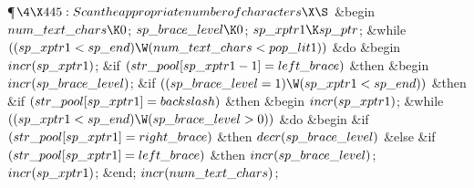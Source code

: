 \Y\P$\4\X445:Scan the appropriate number of characters\X\S$\6
\&{begin} $\\{num\_text\_chars}\K0$;\5
$\\{sp\_brace\_level}\K0$;\5
$\\{sp\_xptr1}\K\\{sp\_ptr}$;\6
\&{while} $((\\{sp\_xptr1}<\\{sp\_end})\W(\\{num\_text\_chars}<\\{pop\_lit1}))$
\1\&{do}\6
\&{begin} $\\{incr}(\\{sp\_xptr1})$;\6
\&{if} $(\\{str\_pool}[\\{sp\_xptr1}-1]=\\{left\_brace})$ \1\&{then}\6
\&{begin} $\\{incr}(\\{sp\_brace\_level})$;\6
\&{if} $((\\{sp\_brace\_level}=1)\W(\\{sp\_xptr1}<\\{sp\_end}))$ \1\&{then}\6
\&{if} $(\\{str\_pool}[\\{sp\_xptr1}]=\\{backslash})$ \1\&{then}\6
\&{begin} $\\{incr}(\\{sp\_xptr1})$;\6
\&{while} $((\\{sp\_xptr1}<\\{sp\_end})\W(\\{sp\_brace\_level}>0))$ \1\&{do}\6
\&{begin} \&{if} $(\\{str\_pool}[\\{sp\_xptr1}]=\\{right\_brace})$ \1%
\&{then}\5
$\\{decr}(\\{sp\_brace\_level})$\6
\4\&{else} \&{if} $(\\{str\_pool}[\\{sp\_xptr1}]=\\{left\_brace})$ \1\&{then}\5
$\\{incr}(\\{sp\_brace\_level})$;\2\2\6
$\\{incr}(\\{sp\_xptr1})$;\6
\&{end};\2\6
$\\{incr}(\\{num\_text\_chars})$;\6
